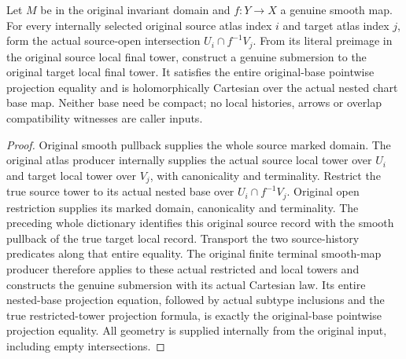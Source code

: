 \begin{theorem}
\label{hir:original-local-terminal-actual-smooth-chart-arrow}
\leanok
{}
Let $M$ be in the original invariant domain and $f:Y\to X$ a genuine
smooth map. For every internally selected original source atlas index
$i$ and target atlas index $j$, form the actual source-open intersection
$U_i\cap f^{-1}V_j$. From its literal preimage in the original source
local final tower, construct a genuine submersion to the original target
local final tower. It satisfies the entire original-base pointwise
projection equality and is holomorphically Cartesian over the actual
nested chart base map. Neither base need be compact; no local histories,
arrows or overlap compatibility witnesses are caller inputs.
\end{theorem}
\begin{proof}
Original smooth pullback supplies the whole source marked domain. The
original atlas producer internally supplies the actual source local
tower over $U_i$ and target local tower over $V_j$, with canonicality and
terminality. Restrict the true source tower to its actual nested base
over $U_i\cap f^{-1}V_j$. Original open restriction supplies its marked
domain, canonicality and terminality. The preceding whole dictionary
identifies this original source record with the smooth pullback of the
true target local record. Transport the two source-history predicates
along that entire equality. The original finite terminal smooth-map
producer therefore applies to these actual restricted and local towers
and constructs the genuine submersion with its actual Cartesian law.
Its entire nested-base projection equation, followed by actual subtype
inclusions and the true restricted-tower projection formula, is exactly
the original-base pointwise projection equality. All geometry is supplied
internally from the original input, including empty intersections.
\end{proof}
